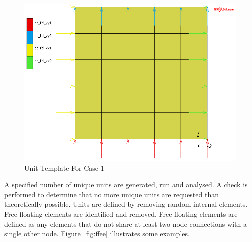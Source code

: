 \begin{figure}[H]
	\includegraphics[width=1\textwidth]{grid_1_5x5.png}
	\caption{Unit Template For Case 1}
	\label{fig:ut1}
\end{figure}

A specified number of unique units are generated, run and analysed. A check is performed to determine that no more unique units are requested than theoretically possible. Units are defined by removing random internal elements. Free-floating elements are identified and removed. Free-floating elements are defined as any elements that do not share at least two node connections with a single other node. Figure~\ref{fig:ffee} illustrates some examples.

